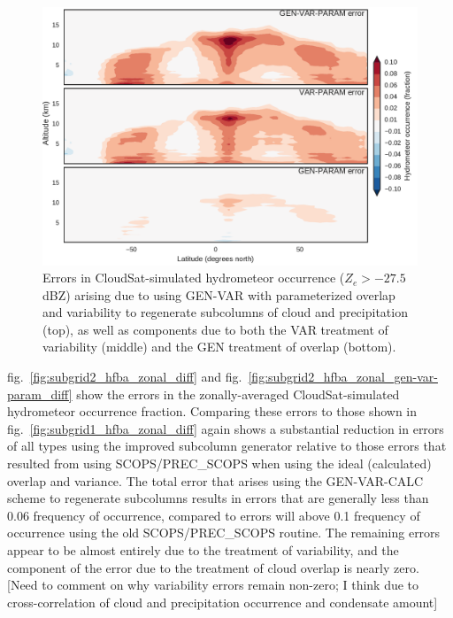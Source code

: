 \begin{figure}[htbp]
\centering
\includegraphics{graphics/subgrid2_hfba_zonal_gen-var-param_diff.pdf}
\caption{\label{fig:subgrid2_hfba_zonal_gen-var-param_diff}Errors in
CloudSat-simulated hydrometeor occurrence (\(Z_e > -27.5\) dBZ) arising
due to using GEN-VAR with parameterized overlap and variability to
regenerate subcolumns of cloud and precipitation (top), as well as
components due to both the VAR treatment of variability (middle) and the
GEN treatment of overlap
(bottom).}\label{fig:subgrid2ux5fhfbaux5fzonalux5fgen-var-paramux5fdiff}
\end{figure}

fig.~\ref{fig:subgrid2_hfba_zonal_diff} and
fig.~\ref{fig:subgrid2_hfba_zonal_gen-var-param_diff} show the errors in
the zonally-averaged CloudSat-simulated hydrometeor occurrence fraction.
Comparing these errors to those shown in
fig.~\ref{fig:subgrid1_hfba_zonal_diff} again shows a substantial
reduction in errors of all types using the improved subcolumn generator
relative to those errors that resulted from using SCOPS/PREC\_SCOPS when
using the ideal (calculated) overlap and variance. The total error that
arises using the GEN-VAR-CALC scheme to regenerate subcolumns results in
errors that are generally less than 0.06 frequency of occurrence,
compared to errors will above 0.1 frequency of occurrence using the old
SCOPS/PREC\_SCOPS routine. The remaining errors appear to be almost
entirely due to the treatment of variability, and the component of the
error due to the treatment of cloud overlap is nearly zero. {[}Need to
comment on why variability errors remain non-zero; I think due to
cross-correlation of cloud and precipitation occurrence and condensate
amount{]}

